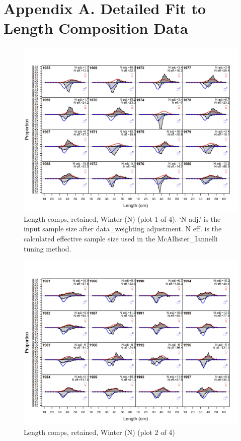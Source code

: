 \documentclass[12pt,]{article}
\begin{document}
\FloatBarrier

\newpage

\FloatBarrier
\newpage

\section{Appendix A. Detailed Fit to Length Composition
Data}\label{appendix-a.-detailed-fit-to-length-composition-data}

\begin{figure}
\centering
\includegraphics{r4ss/plots_mod1/comp_lenfit_flt1mkt2_page1.png}
\caption{Length comps, retained, Winter (N) (plot 1 of 4). `N adj.' is
the input sample size after data\_weighting adjustment. N eff. is the
calculated effective sample size used in the McAllister\_Iannelli tuning
method. \label{fig:length_fits}}
\end{figure}

\begin{figure}
\centering
\includegraphics{r4ss/plots_mod1/comp_lenfit_flt1mkt2_page2.png}
\caption{Length comps, retained, Winter (N) (plot 2 of 4)
\label{fig:length_fits}}
\end{figure}
\end{document}
